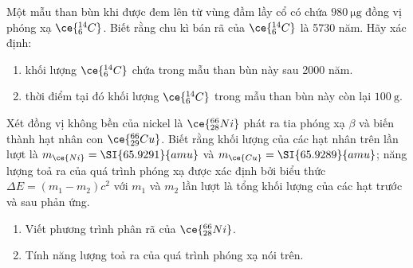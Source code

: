 \begin{ex}
	Một mẫu than bùn khi được đem lên từ vùng đầm lầy cổ có chứa $\SI{980}{\micro\gram}$ đồng vị phóng xạ $\ce{_6^{14}C}$. Biết rằng chu kì bán rã của $\ce{_6^{14}C}$ là 5730 năm. Hãy xác định:
	\begin{enumerate}[label=\alph*)]
		\item khối lượng $\ce{_6^{14}C}$ chứa trong mẫu than bùn này sau 2000 năm.
		\item thời điểm tại đó khối lượng $\ce{_6^{14}C}$ trong mẫu than bùn này còn lại $\SI{100}{\gram}$.
	\end{enumerate}
\end{ex}
\begin{ex}
	Xét đồng vị không bền của nickel là $\ce{_{28}^{66}Ni}$ phát ra tia phóng xạ $\beta$ và biến thành hạt nhân con $\ce{_{29}^{66}Cu}$. Biết rằng khối lượng của các hạt nhân trên lần lượt là $m_{\ce{Ni}}=\SI{65.9291}{amu}$ và $m_{\ce{Cu}}=\SI{65.9289}{amu}$; năng lượng toả ra của quá trình phóng xạ được xác định bởi biểu thức $\Delta E=\left(m_1-m_2\right) c^2$ với $m_1$ và $m_2$ lần lượt là tổng khối lượng của các hạt trước và sau phản ứng.
	\begin{enumerate}[label=\alph*)]
		\item Viết phương trình phân rã của $\ce{_{28}^{66}Ni}$.
		\item Tính năng lượng toả ra của quá trình phóng xạ nói trên.
	\end{enumerate}
\end{ex}

